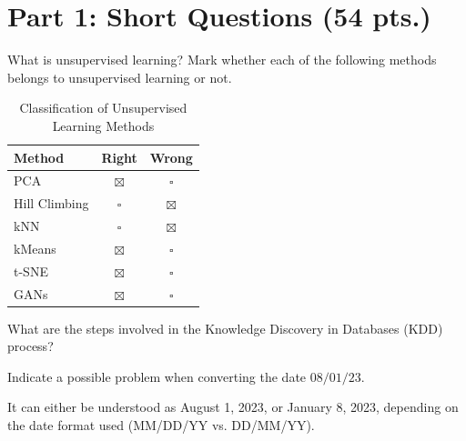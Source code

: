 \documentclass[12pt]{article}
\begin{document}
    \setcounter{section}{0}
    \setcounter{ejercicio}{0}

    \newpage\newpage

    \section*{Part 1: Short Questions (54 pts.)}

    \begin{ejercicio}
        What is unsupervised learning? Mark whether each of the following methods belongs to unsupervised learning or not.

        \begin{table}[h!]
        \centering
        \begin{tabular}{lcc}
        \hline
        \textbf{Method} & \textbf{Right} & \textbf{Wrong} \\ \hline
        PCA & $\boxtimes$ & $\square$ \\
        Hill Climbing & $\square$ & $\boxtimes$ \\
        kNN & $\square$ & $\boxtimes$ \\
        kMeans & $\boxtimes$ & $\square$ \\
        t-SNE & $\boxtimes$ & $\square$ \\
        GANs & $\boxtimes$ & $\square$ \\ \hline
        \end{tabular}
        \caption{Classification of Unsupervised Learning Methods}
        \label{tab:unsupervised_methods2}
        \end{table}
    \end{ejercicio}

    \begin{ejercicio}
        What are the steps involved in the Knowledge Discovery in Databases (KDD) process?
    \end{ejercicio}

    \begin{ejercicio}
        Indicate a possible problem when converting the date $08/01/23$.

        It can either be understood as August 1, 2023, or January 8, 2023, depending on the date format used (MM/DD/YY vs. DD/MM/YY).
    \end{ejercicio}
\end{document}

